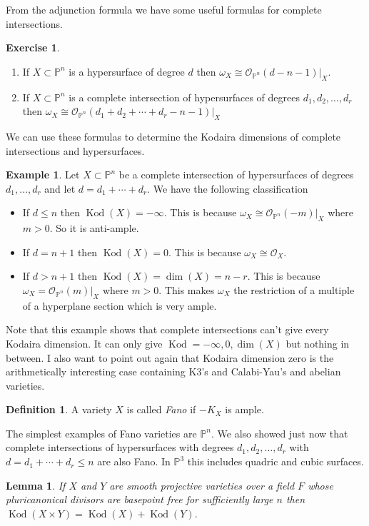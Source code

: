 \documentclass[12pt]{article}
\numberwithin{equation}{section}
\newtheorem{lemma}[theorem]{Lemma}
\theoremstyle{definition}
\newtheorem{definition}[theorem]{Definition}
\newtheorem{example}[theorem]{Example}
\newtheorem{exercise}[theorem]{Exercise}
\theoremstyle{remark}
\newcommand{\Ocal}{\mathcal{O}}
\newcommand{\PP}{\mathbb{P}}
\newcommand{\kod}{\operatorname{Kod}}
\begin{document}
From the adjunction formula we have some useful formulas for complete intersections. 
\begin{exercise}
	\begin{enumerate}
	\item If $X\subset \PP^n$ is a hypersurface of degree $d$ then $\omega_X \cong \Ocal_{\PP^n}(d-n-1)\vert_X$.
	\item If $X\subset \PP^n$ is a complete intersection of hypersurfaces of degrees $d_1,d_2,\ldots,d_r$ then $\omega_X \cong \Ocal_{\PP^n}(d_1+d_2+\cdots + d_r -n-1)\vert_X$
	\end{enumerate}
We can use these formulas to determine the Kodaira dimensions of complete intersections and hypersurfaces. 
\begin{example}
	Let $X\subset \PP^n$ be a complete intersection of hypersurfaces of degrees $d_1,\ldots, d_r$ and let $d=d_1+\cdots +d_r$. 
	We have the following classification
	\begin{itemize}
		\item If $d \leq n$ then $\kod(X) = -\infty$. 
		This is because $\omega_X \cong \Ocal_{\PP^n}(-m)\vert_X$ where $m>0$. 
		So it is anti-ample.
		\item If $d=n+1$ then $\kod(X)=0$. This is because $\omega_X \cong \Ocal_X$. 
		\item If $d> n+1$ then $\kod(X)=\dim(X)=n-r$. 
		This is because $\omega_X = \Ocal_{\PP^n}(m)\vert_{X}$ where $m>0$. 
		This makes $\omega_X$ the restriction of a multiple of a hyperplane section which is very ample. 
	\end{itemize}
\end{example}	
\end{exercise}
Note that this example shows that complete intersections can't give every Kodaira dimension.
It can only give $\kod=-\infty,0,\dim(X)$ but nothing in between.
I also want to point out again that Kodaira dimension zero is the arithmetically interesting case containing K3's and Calabi-Yau's and abelian varieties. 

\begin{definition}
	A variety $X$ is called \emph{Fano} if $-K_X$ is ample. 
\end{definition}
The simplest examples of Fano varieties are $\PP^n$.
We also showed just now that complete intersections of hypersurfaces with degrees $d_1,d_2,\ldots,d_r$ with $d=d_1+\cdots+d_r\leq n$ are also Fano.
In $\PP^3$ this includes quadric and cubic surfaces.

\begin{lemma}\label{lem:kodaira-additive}
	If $X$ and $Y$ are smooth projective varieties over a field $F$ whose pluricanonical divisors are basepoint free for sufficiently large $n$ then 
	$\kod(X\times Y) = \kod(X) + \kod(Y)$.
\end{lemma} 
\end{document}
